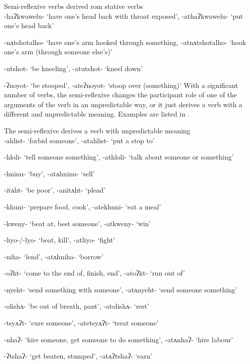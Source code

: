 \documentclass[output=paper]{langscibook}
\begin{document}
          

    

\ea%
    \label{ex:oneida:21}
    Semi-reflexive verbs derived rom stative verbs\\
   {-haʔkwawelu-} ‘have one’s head back with throat exposed’, {-athaʔkwawelu-} ‘put         one’s head back’

    {{}-nʌtshotalho-} ‘have one’s arm hooked through something, {{}-atnʌtshotalho-} ‘hook       one’s arm (through someone else’s)’

    {{}-utshot-} ‘be kneeling’, {{}-atutshot-} ‘kneel down’

    {{}-ʔnoyot-} ‘be stooped’, {{}-ateʔnoyot-} ‘stoop over (something)’
    \z
   With a significant number of verbs, the semi-reflexive changes the participant role of one of the arguments of the verb in an unpredictable way, or it just derives a verb with a different and unpredictable meaning. Examples are listed in .

\ea%
    \label{ex:oneida:22}
    The semi-reflexive derives a verb with unpredictable meaning\\
     {{}-ahlist-} ‘forbid someone’, {{}-atahlist-} ‘put a stop to’

    {{}-hloli-} ‘tell someone something’, {{}-athloli-} ‘talk about someone or something’

    {{}-hninu-} ‘buy’, {{}-atʌhninu-} ‘sell’

    {{}-itʌht-} ‘be poor’, {{}-anitʌht-} ‘plead’

    {{}-khuni-} ‘prepare food, cook’, {{}-atekhuni-} ‘eat a meal’

    {{}-kweny-} ‘beat at, best someone’, {{}-atkweny-} ‘win’

    {{}-liyo-/-lyo-} ‘beat, kill’, {{}-atliyo-} ‘fight’

    {{}-niha-} ‘lend’, {{}-atʌhniha-} ‘borrow’

    {{}-oʔkt-} ‘come to the end of, finish, end’, {{}-atoʔkt-} ‘run out of’

    {{}-nyeht-} ‘send something with someone’, {{}-atʌnyeht-} ‘send someone something’

    {{}-olishʌ-} ‘be out of breath, pant’, {{}-atolishʌ-} ‘rest’

    {{}-tsyʌʔt-} ‘cure someone’, {{}-atetsyʌʔt-} ‘treat someone’

    {{}-nhaʔ-} ‘hire someone, get someone to do something’, {{}-atʌnhaʔ-} ‘hire labour’

    {{}-ʔtshaʔ-} ‘get beaten, stumped’, {{}-atʌʔtshaʔ-} ‘earn’
    \z
\end{document}
